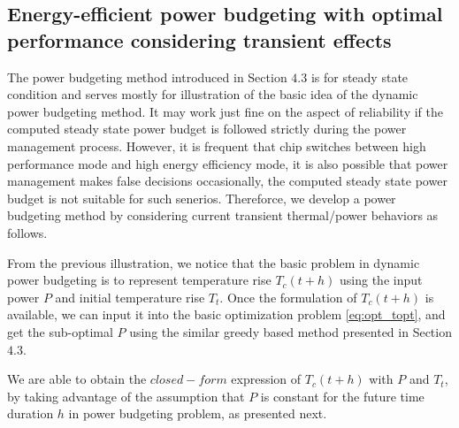 
\subsection{Energy-efficient power budgeting with optimal performance considering transient effects}
The power budgeting method introduced in Section $4.3$ is for steady state condition and serves mostly for illustration of the basic idea of the dynamic power budgeting method. It may work just fine on the aspect of reliability if the computed steady state power budget is followed strictly during the power management process. However, it is frequent that chip switches between high performance mode and high energy efficiency mode, it is also possible that power management makes false decisions occasionally, the computed steady state power budget is not suitable for such senerios. Thereforce, we develop a power budgeting method by considering current transient thermal/power behaviors as follows.

From the previous illustration, we notice that the basic problem in dynamic power budgeting is to represent temperature rise $T_{c}(t+h)$ using the input power $P$ and initial temperature rise $T_{t}$. Once the formulation of $T_{c}(t+h)$ is available, we can input it into the basic optimization problem \eqref{eq:opt_topt}, and get the sub-optimal $P$ using the similar greedy based method presented in Section $4.3$.

We are able to obtain the $closed-form$ expression of $T_{c}(t+h)$ with $P$ and $T_{t}$, by taking advantage of the assumption that $P$ is constant for the future time duration $h$ in power budgeting problem, as presented next.


